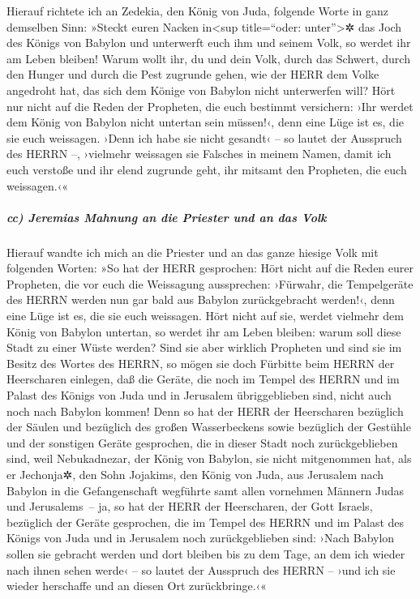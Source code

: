 Hierauf richtete ich an Zedekia, den König von Juda,
folgende Worte in ganz demselben Sinn: »Steckt euren Nacken
in\textless sup title=``oder: unter''\textgreater✲ das Joch des Königs
von Babylon und unterwerft euch ihm und seinem Volk, so werdet ihr am
Leben bleiben! Warum wollt ihr, du und dein Volk, durch
das Schwert, durch den Hunger und durch die Pest zugrunde gehen, wie der
HERR dem Volke angedroht hat, das sich dem Könige von Babylon nicht
unterwerfen will? Hört nur nicht auf die Reden der
Propheten, die euch bestimmt versichern: ›Ihr werdet dem König von
Babylon nicht untertan sein müssen!‹, denn eine Lüge ist es, die sie
euch weissagen. ›Denn ich habe sie nicht gesandt‹ -- so
lautet der Ausspruch des HERRN --, ›vielmehr weissagen sie Falsches in
meinem Namen, damit ich euch verstoße und ihr elend zugrunde geht, ihr
mitsamt den Propheten, die euch weissagen.‹«

\hypertarget{cc-jeremias-mahnung-an-die-priester-und-an-das-volk}{%
\subparagraph{cc) Jeremias Mahnung an die Priester und an das
Volk}\label{cc-jeremias-mahnung-an-die-priester-und-an-das-volk}}

Hierauf wandte ich mich an die Priester und an das ganze
hiesige Volk mit folgenden Worten: »So hat der HERR gesprochen: Hört
nicht auf die Reden eurer Propheten, die vor euch die Weissagung
aussprechen: ›Fürwahr, die Tempelgeräte des HERRN werden nun gar bald
aus Babylon zurückgebracht werden!‹, denn eine Lüge ist es, die sie euch
weissagen. Hört nicht auf sie, werdet vielmehr dem König
von Babylon untertan, so werdet ihr am Leben bleiben: warum soll diese
Stadt zu einer Wüste werden? Sind sie aber wirklich
Propheten und sind sie im Besitz des Wortes des HERRN, so mögen sie doch
Fürbitte beim HERRN der Heerscharen einlegen, daß die Geräte, die noch
im Tempel des HERRN und im Palast des Königs von Juda und in Jerusalem
übriggeblieben sind, nicht auch noch nach Babylon kommen!
Denn so hat der HERR der Heerscharen bezüglich der Säulen
und bezüglich des großen Wasserbeckens sowie bezüglich der Gestühle und
der sonstigen Geräte gesprochen, die in dieser Stadt noch
zurückgeblieben sind, weil Nebukadnezar, der König von
Babylon, sie nicht mitgenommen hat, als er Jechonja✲, den Sohn Jojakims,
den König von Juda, aus Jerusalem nach Babylon in die Gefangenschaft
wegführte samt allen vornehmen Männern Judas und Jerusalems~--
ja, so hat der HERR der Heerscharen, der Gott Israels,
bezüglich der Geräte gesprochen, die im Tempel des HERRN und im Palast
des Königs von Juda und in Jerusalem noch zurückgeblieben sind:
›Nach Babylon sollen sie gebracht werden und dort bleiben
bis zu dem Tage, an dem ich wieder nach ihnen sehen werde‹ -- so lautet
der Ausspruch des HERRN -- ›und ich sie wieder herschaffe und an diesen
Ort zurückbringe.‹«

